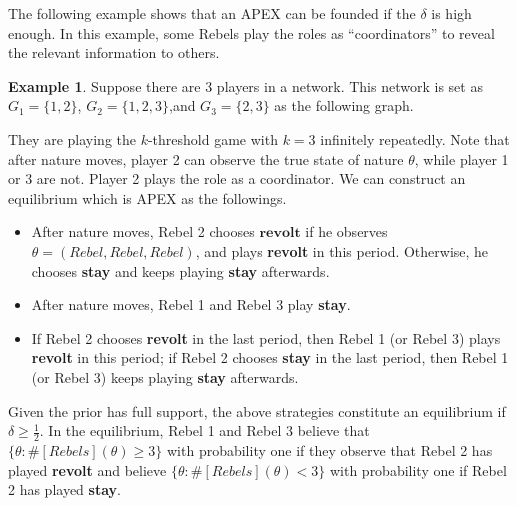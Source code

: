 \documentclass[12pt,letter]{article}
\theoremstyle{definition}
\newtheorem{example}{Example}[section]
\theoremstyle{remark}
\theoremstyle{claim}
\begin{document}
The following example shows that an APEX can be founded if the $\delta$ is high enough. In this example, some Rebels play the roles as ``coordinators'' to reveal the relevant information to others.
\begin{example}\label{ex_leading_ex}
Suppose there are 3 players in a network.  This network is set as $G_1=\{1,2\}$, $G_2=\{1,2,3\}$,and $G_3=\{2,3\}$ as the following graph.

\begin{center}
\end{center}

They are playing the $k$-threshold game with $k=3$ infinitely repeatedly. Note that after nature moves, player 2 can observe the true state of nature $\theta$, while player 1 or 3 are not. Player 2 plays the role as a coordinator. We can construct an equilibrium which is APEX as the followings. 

\begin{itemize}
\item After nature moves, Rebel 2 chooses $\textbf{revolt}$ if he observes $\theta=(Rebel,Rebel,Rebel)$, and plays \textbf{revolt} in this period. Otherwise, he chooses \textbf{stay} and keeps playing \textbf{stay} afterwards. 
\item After nature moves, Rebel 1 and Rebel 3 play \textbf{stay}.
\item If Rebel 2 chooses \textbf{revolt} in the last period, then Rebel 1 (or Rebel 3) plays \textbf{revolt} in this period; if Rebel 2 chooses \textbf{stay} in the last period, then Rebel 1 (or Rebel 3) keeps playing \textbf{stay} afterwards. 
\end{itemize}

Given the prior has full support, the above strategies constitute an equilibrium if $\delta\geq \frac{1}{2}$. In the equilibrium, Rebel 1 and Rebel 3 believe that $\{\theta:\#[Rebels](\theta)\geq 3\}$ with probability one if they observe that Rebel 2 has played \textbf{revolt} and believe $\{\theta:\#[Rebels](\theta)< 3\}$ with probability one if Rebel 2 has played \textbf{stay}.
\end{example}
\end{document}
